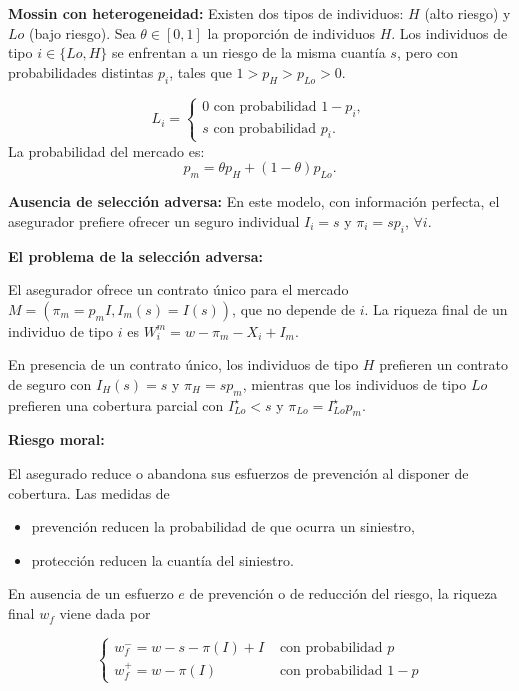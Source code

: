 \begin{f}
	
	\textbf{Mossin con heterogeneidad:} Existen dos tipos de individuos: \(H\) (alto riesgo) y \(Lo\) (bajo riesgo). Sea \(\theta \in[0,1]\) la proporción de individuos \(H\). Los individuos de tipo \(i \in\{Lo, H\}\) se enfrentan a un riesgo de la misma cuantía \(s\), pero con probabilidades distintas \(p_{i}\), tales que \(1>p_{H}>p_{Lo}>0\).
	
	\[
	L_{i}=\left\{\begin{array}{l}
		0 \text { con probabilidad } 1-p_{i}, \\
		s \text { con probabilidad } p_{i}.
	\end{array}\right.
	\]
	La probabilidad del mercado es:
	\[
	p_{m}=\theta p_{H}+(1-\theta) p_{Lo}.
	\]
	
	\textbf{Ausencia de selección adversa:} En este modelo, con información perfecta, el asegurador prefiere ofrecer un seguro individual \(I_{i}=s\) y \(\pi_{i}=s p_{i}\), \(\forall i\).
	
	\textbf{El problema de la selección adversa:}
	
	El asegurador ofrece un contrato único para el mercado
	\(M=\left(\pi_{m}=p_{m} I, I_{m}(s)=I(s)\right)\), que no depende de \(i\). La riqueza final de un individuo de tipo \(i\) es
	\(W_{i}^{m}=w-\pi_{m}-X_{i}+I_{m}\).
	
	En presencia de un contrato único, los individuos de tipo \(H\) prefieren un contrato de seguro con \(I_{H}(s)=s\) y \(\pi_{H}=s p_{m}\), mientras que los individuos de tipo \(Lo\) prefieren una cobertura parcial con \(I_{Lo}^{\star}<s\) y \(\pi_{Lo}=I_{Lo}^{\star} p_{m}\).
	\medskip
	
	\textbf{Riesgo moral:}
	
	El asegurado reduce o abandona sus esfuerzos de prevención al disponer de cobertura. Las medidas de
	\begin{itemize}
		\item prevención reducen la probabilidad de que ocurra un siniestro,
		\item protección reducen la cuantía del siniestro.
	\end{itemize}
	
	En ausencia de un esfuerzo \(e\) de prevención o de reducción del riesgo, la riqueza final \(w_{f}\) viene dada por
	
	\[
	\begin{cases}
		w_{f}^{-}=w-s-\pi(I)+I & \text { con probabilidad } p \\
		w_{f}^{+}=w-\pi(I) & \text { con probabilidad } 1-p
	\end{cases}
	\]
	

\end{f}
